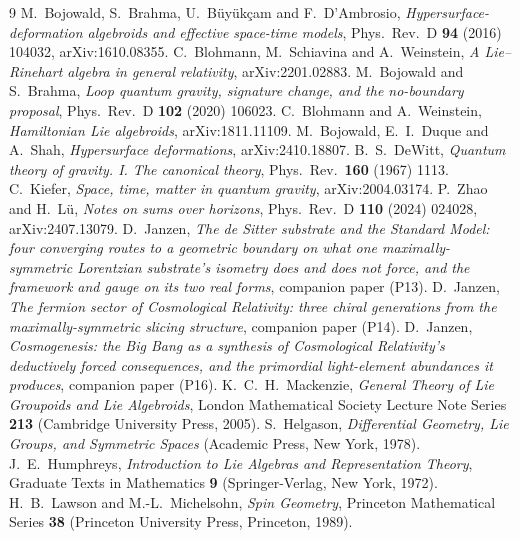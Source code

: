 \documentclass[11pt,a4paper]{article}
\theoremstyle{plain}
\theoremstyle{definition}
\theoremstyle{remark}
\begin{document}
\begin{thebibliography}{9}
 M.~Bojowald, S.~Brahma, U.~B\"uy\"uk\c{c}am and F.~D'Ambrosio, \emph{Hypersurface-deformation algebroids and effective space-time models}, Phys.\ Rev.\ D \textbf{94} (2016) 104032, arXiv:1610.08355.
 C.~Blohmann, M.~Schiavina and A.~Weinstein, \emph{A Lie--Rinehart algebra in general relativity}, arXiv:2201.02883.
 M.~Bojowald and S.~Brahma, \emph{Loop quantum gravity, signature change, and the no-boundary proposal}, Phys.\ Rev.\ D \textbf{102} (2020) 106023.
 C.~Blohmann and A.~Weinstein, \emph{Hamiltonian Lie algebroids}, arXiv:1811.11109.
 M.~Bojowald, E.~I.~Duque and A.~Shah, \emph{Hypersurface deformations}, arXiv:2410.18807.
 B.~S.~DeWitt, \emph{Quantum theory of gravity. I. The canonical theory}, Phys.\ Rev.\ \textbf{160} (1967) 1113.
 C.~Kiefer, \emph{Space, time, matter in quantum gravity}, arXiv:2004.03174.
 P.~Zhao and H.~L\"u, \emph{Notes on sums over horizons}, Phys.\ Rev.\ D \textbf{110} (2024) 024028, arXiv:2407.13079.
 D.~Janzen, \emph{The de Sitter substrate and the Standard Model: four converging routes to a geometric boundary on what one maximally-symmetric Lorentzian substrate's isometry does and does not force, and the framework and gauge on its two real forms}, companion paper (P13).
 D.~Janzen, \emph{The fermion sector of Cosmological Relativity: three chiral generations from the maximally-symmetric slicing structure}, companion paper (P14).
 D.~Janzen, \emph{Cosmogenesis: the Big Bang as a synthesis of Cosmological Relativity's deductively forced consequences, and the primordial light-element abundances it produces}, companion paper (P16).
 K.~C.~H.~Mackenzie, \emph{General Theory of Lie Groupoids and Lie Algebroids}, London Mathematical Society Lecture Note Series \textbf{213} (Cambridge University Press, 2005).
 S.~Helgason, \emph{Differential Geometry, Lie Groups, and Symmetric Spaces} (Academic Press, New York, 1978).
 J.~E.~Humphreys, \emph{Introduction to Lie Algebras and Representation Theory}, Graduate Texts in Mathematics \textbf{9} (Springer-Verlag, New York, 1972).
 H.~B.~Lawson and M.-L.~Michelsohn, \emph{Spin Geometry}, Princeton Mathematical Series \textbf{38} (Princeton University Press, Princeton, 1989).
\end{thebibliography}



\end{document}

